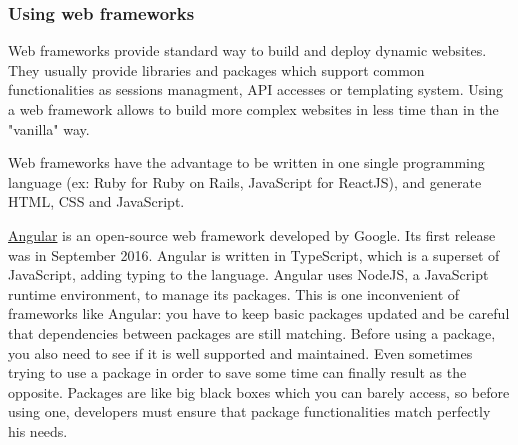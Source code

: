 \documentclass{article}
\begin{document}
                    \subsubsection{Using web frameworks}
                        Web frameworks provide standard way to build and deploy dynamic websites. They usually provide libraries and packages
                        which support common functionalities as sessions managment, API accesses or templating system. 
                        Using a web framework allows to build more complex websites in less time than in the "vanilla" way.
                        
                        Web frameworks have the advantage to be written in one single programming language (ex: Ruby for Ruby on Rails, JavaScript for ReactJS),
                        and generate HTML, CSS and JavaScript. \newline
                        

                        \href{https://angular.io/}{Angular} is an open-source web framework developed by Google. Its first release was
                        in September 2016. Angular is written in TypeScript, which is a superset of JavaScript, adding typing to the language.
                        Angular uses NodeJS, a JavaScript runtime environment, to manage its packages.
                        This is one inconvenient of frameworks like Angular: you have to keep basic packages updated and be careful that dependencies
                        between packages are still matching. Before using a package, you also need to see if it is well supported and maintained. Even sometimes
                        trying to use a package in order to save some time can finally result as the opposite. Packages are like big black boxes which you
                        can barely access, so before using one, developers must ensure that package functionalities match perfectly his needs.
\end{document}
